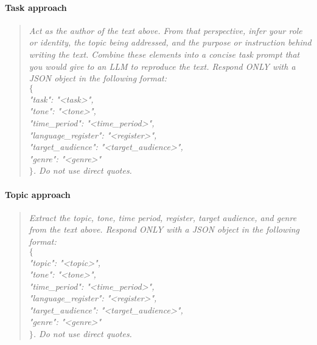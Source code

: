 \paragraph{Task approach}
\begin{quote}
\textit{
Act as the author of the text above. From that perspective, infer your role or identity, the topic being addressed, and the purpose or instruction behind writing the text. 
Combine these elements into a concise task prompt that you would give to an LLM to reproduce the text. 
Respond ONLY with a JSON object in the following format: \\
$\{$ \\
\hspace{1em}"task": "<task>", \\
\hspace{1em}"tone": "<tone>", \\
\hspace{1em}"time\_period": "<time\_period>", \\
\hspace{1em}"language\_register": "<register>", \\
\hspace{1em}"target\_audience": "<target\_audience>", \\
\hspace{1em}"genre": "<genre>" \\
$\}$. 
Do not use direct quotes.
}
\end{quote}


\paragraph{Topic approach}
\begin{quote}
\textit{
Extract the topic, tone, time period, register, target audience, and genre from the text above. 
Respond ONLY with a JSON object in the following format: \\
$\{$ \\
\hspace{1em}"topic": "<topic>", \\
\hspace{1em}"tone": "<tone>", \\
\hspace{1em}"time\_period": "<time\_period>", \\
\hspace{1em}"language\_register": "<register>", \\
\hspace{1em}"target\_audience": "<target\_audience>", \\
\hspace{1em}"genre": "<genre>" \\
$\}$. 
Do not use direct quotes.
}
\end{quote}


